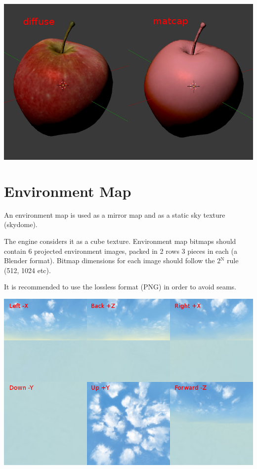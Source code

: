 \documentclass[a4paper,12pt,oneside]{sphinxmanual}
\begin{document}
\begin{DUlineblock}{0em}
\item[] 
\end{DUlineblock}

{\hfill\includegraphics[width=1.000\linewidth]{stencil_apple_separate_textures.jpg}\hfill}

\begin{DUlineblock}{0em}
\item[] 
\end{DUlineblock}


\section{Environment Map}
\label{textures:environment-map}\label{textures:index-10}
An environment map is used as a mirror map and as a static sky texture (skydome).

The engine considers it as a cube texture. Environment map bitmaps should contain 6 projected environment images, packed in 2 rows 3 pieces in each (a Blender format). Bitmap dimensions for each image should follow the 2$^{\text{N}}$ rule (512, 1024 etc).

It is recommended to use the lossless format (PNG) in order to avoid seams.

{\hfill\includegraphics[width=1.000\linewidth]{environment_map.png}\hfill}
\end{document}
